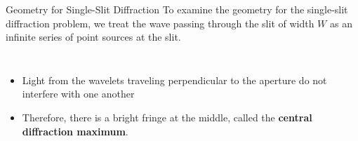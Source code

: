 \documentclass[12pt,compress,aspectratio=169]{beamer}
\begin{document}
\begin{frame}{Geometry for Single-Slit Diffraction}
  To examine the geometry for the single-slit diffraction problem, we treat
  the wave passing through the slit of width $W$ as an infinite series of point
  sources at the slit.
  
  \vspace{.2in}\begin{columns}
    
    \begin{itemize}
    \item Light from the wavelets traveling perpendicular to the aperture do
      not interfere with one another
    \item Therefore, there is a bright fringe at the middle, called the
      \textbf{central diffraction maximum}.
    \end{itemize}
  \end{columns}
\end{frame}
\end{document}
